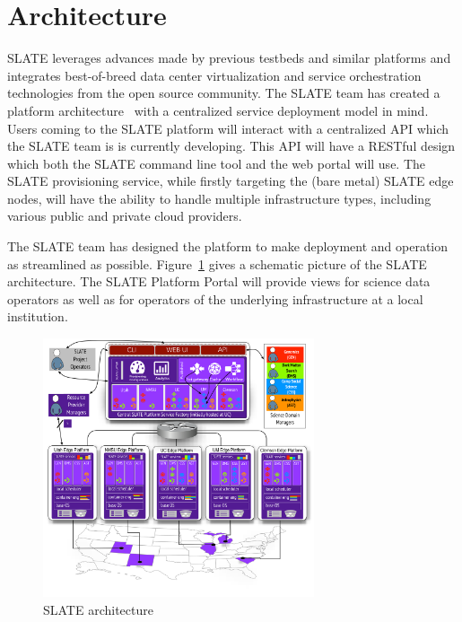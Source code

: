 \documentclass[sigconf]{acmart}
\begin{document}
\section{Architecture}


SLATE leverages advances made by previous testbeds \cite{Berman2014,GENI,RicciEide:login14,Baldine2012,Chameleon} and similar platforms \cite{Cyverse, PRP} and integrates best-of-breed data center virtualization and service orchestration technologies from the open source community.  The SLATE team has created a platform architecture~\cite{SLATE-Architecture} with a centralized service deployment model in mind. Users coming to the SLATE platform will interact with a centralized API which the SLATE team is is currently developing. This API will have a RESTful design which both the SLATE command line tool and the web portal will use.  The SLATE provisioning service, while firstly targeting the (bare metal) SLATE edge nodes, will have the ability to handle multiple infrastructure types, including various public and private cloud providers.  

The SLATE team has designed the platform to make deployment and operation as streamlined as possible.  Figure~\ref{fig:slate_architecture} gives a schematic picture of the SLATE architecture. The SLATE Platform Portal will provide views for science data operators as well as for operators of the underlying infrastructure at a local institution. 

\begin{figure}
    \centering
    \includegraphics[width=8cm]{slate_architecture.png}
    \caption{SLATE architecture}
    \label{fig:slate_architecture}
\end{figure}
\end{document}

